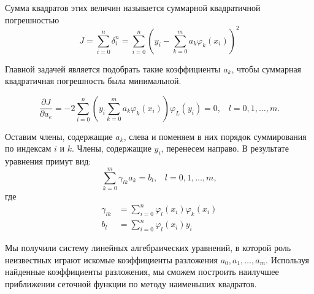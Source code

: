 \documentclass[a4paper, 14pt]{extreport}
\begin{document}
Сумма квадратов этих величин называется суммарной квадратичной погрешностью
$$J=\sum_{i=0}^{n} \delta_{i}^{n}=\sum_{i=0}^{n}\left(y_{i}-\sum_{k=0}^{m} a_{k} \varphi_{k}\left(x_{i}\right)\right)^{2}
$$

Главной задачей является подобрать такие коэффициенты $a_{k}$, чтобы суммарная квадратичная погрешность была минимальной.
\\ 

$$\frac{\partial J}{\partial a_{e}}=-2 \sum_{i=0}^{n}\left(y_{i} \sum_{k=0}^{m} a_{k} \varphi_{k}\left(x_{i}\right)\right) \varphi_{L}\left(y_{i}\right)=0, \; \; \; l = 0, 1, \ldots, m.$$

Оставим члены, содержащие $a_{k}$, слева и поменяем в них порядок суммирования по индексам $i$ и $k$. Члены, содержащие $y_{i}$, перенесем направо. В результате уравнения примут вид:
$$\sum_{k=0}^{m} \gamma_{l k} a_{k}=b_{l}, \; \; \; l=0,1, \ldots, m,$$ где
$$\begin{aligned} \gamma_{l k} &=\sum_{i=0}^{n} \varphi_{l}\left(x_{i}\right) \varphi_{k}\left(x_{i}\right) \\ b_{l} &=\sum_{i=0}^{n} \varphi_{l}(x_{i}) y_{i} \end{aligned}$$

Мы получили систему линейных алгебраических уравнений, в которой роль неизвестных играют искомые коэффициенты разложения $a_{0}, a_{1}, \ldots, a_{m}$. Используя найденные коэффициенты разложения, мы сможем построить наилучшее приближении сеточной функции по методу наименьших квадратов.
\\ \\ 
\end{document}
